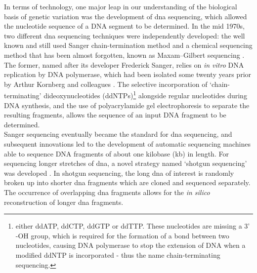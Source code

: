 In terms of technology, one major leap in our understanding of the biological basis of genetic variation was the development of \gls{dna} sequencing, which allowed the nucleotide sequence of a DNA segment to be determined.
In the mid 1970s, two different \gls{dna} sequencing techniques were independently developed: the well known and still used Sanger chain-termination method \cite{sanger1975rapid, sanger1977dna} and a chemical sequencing method that has been almost forgotten, known as Maxam–Gilbert sequencing \cite{maxam1977new}.
The former, named after its developer Frederick Sanger,
relies on \textit{in vitro} DNA replication by DNA polymerase,
which had been isolated some twenty years prior by Arthur Kornberg and colleagues \cite{kornberg1956enzymic}.
The selective incorporation of `chain-terminating' dideoxynucleotides (ddNTPs)\footnote{either ddATP, ddCTP, ddGTP or ddTTP.
These nucleotides are missing a 3' -OH group, which is required for the formation of a bond between two nucleotides, causing DNA polymerase to stop the extension of DNA when a modified ddNTP is incorporated - thus the name chain-terminating sequencing.} alongside regular nucleotides during DNA synthesis, and the use of polyacrylamide gel electrophoresis to separate the resulting fragments, allows
the sequence of an input DNA fragment to be determined. \\

Sanger sequencing eventually became the standard for \gls{dna} sequencing, and
subsequent innovations led to the development of automatic sequencing machines able to sequence DNA fragments of about one kilobase (kb) in length. 
For sequencing longer stretches of \gls{dna}, a novel strategy named `shotgun sequencing' was developed \cite{staden1979strategy, anderson1981shotgun}. 
In shotgun sequencing, the long \gls{dna} of interest is randomly broken up into shorter \gls{dna} fragments which are cloned and sequenced separately. 
The occurrence of overlapping \gls{dna} fragments 
allows for the \textit{in silico} reconstruction of longer \gls{dna} fragments. \\

